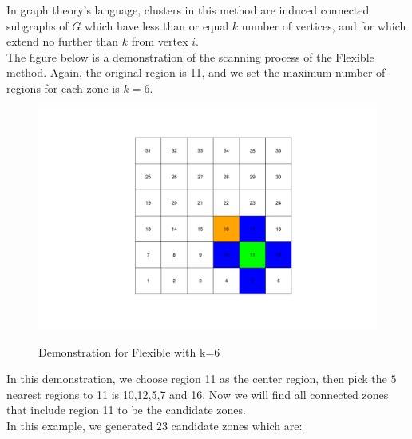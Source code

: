 \documentclass[12pt]{article}
\begin{document}
\begin{enumerate}
			In graph theory's language, clusters in this method are induced connected subgraphs of $G$ which have less than or equal $k$ number of vertices, and for which extend no further than $k$ from vertex $i$.\\
			 	
	
	The figure below is a demonstration of the scanning process of the Flexible method. Again, the original region is 11, and we set the maximum number of regions for each zone is $k=6$.\\
	\begin{figure}[!ht]
		
		\centering
		\includegraphics[scale=0.2]{Demo_Flexible}\\
		\caption{Demonstration for Flexible with k=6 \label{f:gull}}
		
	\end{figure}
	
	
	
	In this demonstration, we choose region 11 as the center region, then pick the $5$ nearest regions to 11 is 10,12,5,7 and 16. Now we will find all connected zones that include region 11 to be the candidate zones.  \\  
	
	In this example, we generated $23$ candidate zones which are: \\
	

		
	\begin{figure}[!ht]
\hspace{2cm}\begin{tabular}{|c|c|c|c|}


\end{tabular}
\end{figure}
\end{enumerate}
\end{document}
